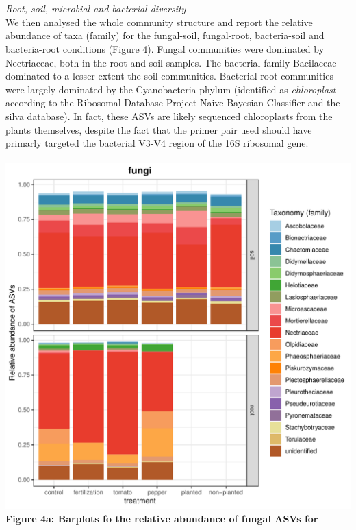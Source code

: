 \documentclass[11pt,]{article}
\begin{document}
~\\
\hspace*{0.333em}\\
\emph{Root, soil, microbial and bacterial diversity}\\
We then analysed the whole community structure and report the relative
abundance of taxa (family) for the fungal-soil, fungal-root,
bacteria-soil and bacteria-root conditions (Figure 4). Fungal
communities were dominated by Nectriaceae, both in the root and soil
samples. The bacterial family Bacilaceae dominated to a lesser extent
the soil communities. Bacterial root communities were largely dominated
by the Cyanobacteria phylum (identified as \emph{chloroplast} according
to the Ribosomal Database Project Naive Bayesian Classifier and the
silva database). In fact, these ASVs are likely sequenced chloroplasts
from the plants themselves, despite the fact that the primer pair used
should have primarly targeted the bacterial V3-V4 region of the 16S
ribosomal gene.\\
\hspace*{0.333em}\\
\includegraphics[width=7.29167in]{../figures/Figure4_FAMILY_barplots_fungi.pdf}\\
\textbf{Figure 4a: Barplots fo the relative abundance of fungal ASVs for
}\\
\end{document}
